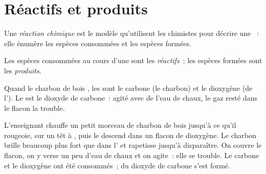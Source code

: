 \section{Réactifs et produits}

\begin{definition}\label{def:g7:chemical-reactions:reaction}
Une \emph{réaction chimique} est le modèle
qu'utilisent les chimistes pour décrire une ~:
elle énumère les espèces consommées et les espèces formées.
\end{definition}

\begin{definition}\label{def:g7:chemical-reactions:reactant}
Les espèces consommées au cours d'une  sont les
\emph{réactifs}~; les espèces formées sont les
\emph{produits}.
\end{definition}

\begin{example}\label{ex:g7:chemical-reactions:carbon}
Quand le charbon de bois , les  sont le carbone (le
charbon) et le dioxygène (de l'). Le  est le dioxyde de
carbone~: agité avec de l'eau de chaux, le gaz resté dans le flacon la
trouble.
\end{example}

\begin{inthelab}
L'enseignant chauffe un petit morceau de charbon de bois jusqu'à ce
qu'il rougeoie, sur un têt à , puis le descend dans un flacon
de dioxygène. Le charbon brille beaucoup plus fort que dans l' et
rapetisse jusqu'à disparaître. On couvre le flacon, on y verse un peu
d'eau de chaux et on agite~: elle se trouble. Le carbone et le dioxygène
ont été consommés~; du dioxyde de carbone s'est formé.
\end{inthelab}

